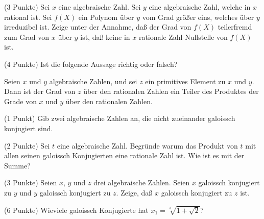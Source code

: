 \documentclass{algsheet}
\begin{document}
\begin{exercise}(3 Punkte)\newline
    Sei \(x\) eine algebraische Zahl. Sei \(y\) eine algebraische Zahl, welche
    in \(x\) rational ist. Sei \(f(X)\) ein Polynom über \(y\) vom Grad größer eins, welches über
    \(y\) irreduzibel ist. Zeige unter der Annahme, daß der Grad von \(f(X)\)
    teilerfremd zum Grad von \(x\) über \(y\) ist, daß keine in \(x\) rationale
    Zahl Nullstelle von \(f(X)\) ist.
\end{exercise}

\begin{exercise}(4 Punkte)\newline
    Ist die folgende Aussage richtig oder falsch?
    
    Seien \(x\) und \(y\) algebraische Zahlen, und sei \(z\) ein
    primitives Element zu \(x\) und \(y\). Dann ist der Grad von \(z\) über den
    rationalen Zahlen ein Teiler des Produktes der Grade von \(x\) und \(y\) über den
    rationalen Zahlen.
\end{exercise}





\begin{exercise}(1 Punkt)\newline
    Gib zwei algebraische Zahlen an, die nicht zueinander galoissch konjugiert sind.
\end{exercise}

\begin{exercise}(2 Punkte)\newline
    Sei \(t\) eine algebraische Zahl. Begründe warum das Produkt von \(t\) mit allen seinen
    galoissch Konjugierten eine rationale Zahl ist. Wie ist es mit der Summe?
\end{exercise}



\begin{exercise}(3 Punkte)\newline
    Seien \(x\), \(y\) und \(z\) drei algebraische Zahlen. Seien \(x\) galoissch konjugiert zu
    \(y\) und \(y\) galoissch konjugiert zu \(z\). Zeige, daß \(x\) galoissch konjugiert zu
    \(z\) ist.
\end{exercise}

\begin{exercise}(6 Punkte)\newline
    Wieviele galoissch Konjugierte hat \(x_1 = \sqrt[3]{1 + \sqrt 2}\)?
\end{exercise}
\end{document}
